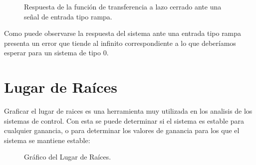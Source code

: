 \documentclass[a4paper,11pt]{article}
\begin{document}
  \begin{figure}[H] %
	\caption{Respuesta de la función de transferencia a lazo cerrado ante una señal de entrada tipo rampa.}
	\label{fig:resp_rampa1}
	\end{figure} 
Como puede observarse la respuesta del sistema ante una entrada tipo rampa presenta un error que tiende al infinito correspondiente a lo que deberíamos esperar para un sistema de tipo 0.

\section{Lugar de Raíces}

Graficar el lugar de raices es una herramienta muy utilizada en los analisis de los sistemas de control. Con esta se puede determinar si el sistema es estable para cualquier ganancia, o para determinar los valores de ganancia para los que el sistema se mantiene estable:

  \begin{figure}[H] %
	\caption{Gráfico del Lugar de Raíces.}
	\label{fig:FTlazoc_rlocus}
	\end{figure} 
\end{document}
